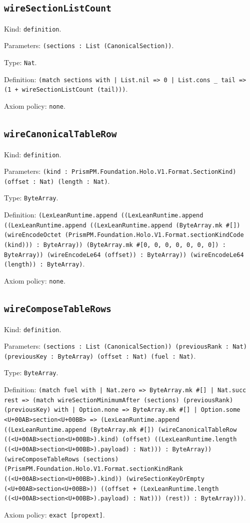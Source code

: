\documentclass[11pt]{article}
\begin{document}
\subsection*{\texttt{wireSectionListCount}}
\noindent Kind: \texttt{definition}.\par
\noindent Parameters: \texttt{(sections : List (CanonicalSection))}.\par
\noindent Type: \texttt{Nat}.\par
\noindent Definition: \texttt{(match sections with | List.nil => 0 | List.cons \_ tail => (1 + wireSectionListCount (tail)))}.\par
\noindent Axiom policy: \texttt{none}.\par
\subsection*{\texttt{wireCanonicalTableRow}}
\noindent Kind: \texttt{definition}.\par
\noindent Parameters: \texttt{(kind : PrismPM.Foundation.Holo.V1.Format.SectionKind) (offset : Nat) (length : Nat)}.\par
\noindent Type: \texttt{ByteArray}.\par
\noindent Definition: \texttt{(LexLeanRuntime.append ((LexLeanRuntime.append ((LexLeanRuntime.append ((LexLeanRuntime.append (ByteArray.mk \#[]) (wireEncodeOctet (PrismPM.Foundation.Holo.V1.Format.sectionKindCode (kind))) : ByteArray)) (ByteArray.mk \#[0, 0, 0, 0, 0, 0, 0]) : ByteArray)) (wireEncodeLe64 (offset)) : ByteArray)) (wireEncodeLe64 (length)) : ByteArray)}.\par
\noindent Axiom policy: \texttt{none}.\par
\subsection*{\texttt{wireComposeTableRows}}
\noindent Kind: \texttt{definition}.\par
\noindent Parameters: \texttt{(sections : List (CanonicalSection)) (previousRank : Nat) (previousKey : ByteArray) (offset : Nat) (fuel : Nat)}.\par
\noindent Type: \texttt{ByteArray}.\par
\noindent Definition: \texttt{(match fuel with | Nat.zero => ByteArray.mk \#[] | Nat.succ rest => (match wireSectionMinimumAfter (sections) (previousRank) (previousKey) with | Option.none => ByteArray.mk \#[] | Option.some <U+00AB>section<U+00BB> => (LexLeanRuntime.append ((LexLeanRuntime.append (ByteArray.mk \#[]) (wireCanonicalTableRow ((<U+00AB>section<U+00BB>).kind) (offset) ((LexLeanRuntime.length ((<U+00AB>section<U+00BB>).payload) : Nat))) : ByteArray)) (wireComposeTableRows (sections) (PrismPM.Foundation.Holo.V1.Format.sectionKindRank ((<U+00AB>section<U+00BB>).kind)) (wireSectionKeyOrEmpty (<U+00AB>section<U+00BB>)) ((offset + (LexLeanRuntime.length ((<U+00AB>section<U+00BB>).payload) : Nat))) (rest)) : ByteArray)))}.\par
\noindent Axiom policy: \texttt{exact [propext]}.\par
\end{document}
